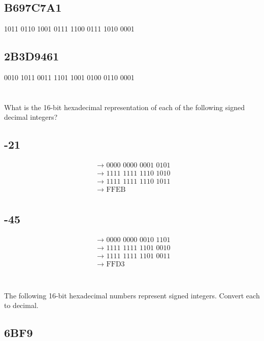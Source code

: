 \documentclass{article}
\begin{document}
\subsection{B697C7A1}
1011 0110 1001 0111 1100 0111 1010 0001

\subsection{2B3D9461}
0010 1011 0011 1101 1001 0100 0110 0001

\section{}
What is the 16-bit hexadecimal representation of each of the following signed decimal integers?

\subsection{-21}

\begin{align*}
	& \rightarrow \text{ 0000 0000 0001 0101 } \\
	& \rightarrow \text{ 1111 1111 1110 1010 } \\
	& \rightarrow \text{ 1111 1111 1110 1011 } \\
	& \rightarrow \text{ FFEB } \\
\end{align*}

\subsection{-45}

\begin{align*}
	& \rightarrow \text{ 0000 0000 0010 1101 } \\
	& \rightarrow \text{ 1111 1111 1101 0010 } \\
	& \rightarrow \text{ 1111 1111 1101 0011 } \\
	& \rightarrow \text{ FFD3 } \\
\end{align*}

\section{}
The following 16-bit hexadecimal numbers represent signed integers. Convert each to decimal.

\subsection{6BF9}
\end{document}
